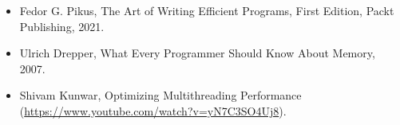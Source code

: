 

\begin{itemize}
\item
Fedor G. Pikus, The Art of Writing Efficient Programs, First Edition, Packt Publishing, 2021.

\item
Ulrich Drepper, What Every Programmer Should Know About Memory, 2007.

\item
Shivam Kunwar, Optimizing Multithreading Performance (\url{https://www.youtube.com/watch?v=yN7C3SO4Uj8}).
\end{itemize}